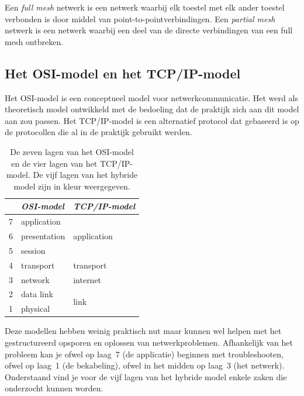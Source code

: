 Een \emph{full mesh} netwerk is een netwerk waarbij elk toestel met elk ander toestel verbonden is door middel van point-to-pointverbindingen.
Een \emph{partial mesh} netwerk is een netwerk waarbij een deel van de directe verbindingen van een full mesh ontbreken.

\subsection{Het OSI-model en het TCP/IP-model}

Het OSI-model is een conceptueel model voor netwerkcommunicatie.
Het werd als theoretisch model ontwikkeld met de bedoeling dat de praktijk zich aan dit model aan zou passen.
Het TCP/IP-model is een alternatief protocol dat gebaseerd is op de protocollen die al in de praktijk gebruikt werden.

\begin{table}[htp]
   \centering
   \begin{tabular}{rll}
   \toprule
     & \textit{OSI-model} & \textit{TCP/IP-model} \\
   \midrule
   7 & application & \multirow{3}{*}{\textcolor{spot1}{application}} \\
   6 & presentation & \\
   5 & session & \\[1ex]
   4 & \textcolor{spot1}{transport} & transport \\[1ex]
   3 & \textcolor{spot1}{network} & internet \\[1ex]
   2 & \textcolor{spot1}{data link} & \multirow{2}{*}{link} \\
   1 & \textcolor{spot1}{physical} & \\
   \bottomrule
   \end{tabular}
   \caption{De zeven lagen van het OSI-model en de vier lagen van het TCP/IP-model.
   De vijf lagen van het hybride model zijn in kleur weergegeven.}
   \label{tab:osi-model}
\end{table}

Deze modellen hebben weinig praktisch nut maar kunnen wel helpen met het gestructureerd opsporen en oplossen van netwerkproblemen.
Afhankelijk van het probleem kan je ofwel op laag~7 (de applicatie) beginnen met troubleshooten, ofwel op laag~1 (de bekabeling), ofwel in het midden op laag~3 (het netwerk).
Onderstaand vind je voor de vijf lagen van het hybride model enkele zaken die onderzocht kunnen worden.

